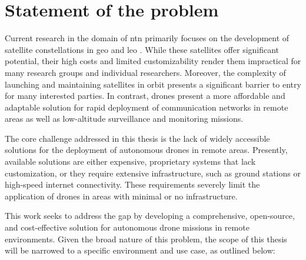 \chapter{Statement of the problem}
\label{ch:statement_of_problem}

Current research in the domain of \gls{ntn} primarily focuses on the development of satellite constellations in \gls{geo} and \gls{leo} \autocite{non_terrestial_networks_trends}. While these satellites offer significant potential, their high costs and limited customizability render them impractical for many research groups and individual researchers. Moreover, the complexity of launching and maintaining satellites in orbit presents a significant barrier to entry for many interested parties. In contrast, drones present a more affordable and adaptable solution for rapid deployment of communication networks in remote areas as well as low-altitude surveillance and monitoring missions.

The core challenge addressed in this thesis is the lack of widely accessible solutions for the deployment of autonomous drones in remote areas. Presently, available solutions are either expensive, proprietary systems that lack customization, or they require extensive infrastructure, such as ground stations or high-speed internet connectivity. These requirements severely limit the application of drones in areas with minimal or no infrastructure.

This work seeks to address the gap by developing a comprehensive, open-source, and cost-effective solution for autonomous drone missions in remote environments. Given the broad nature of this problem, the scope of this thesis will be narrowed to a specific environment and use case, as outlined below:

